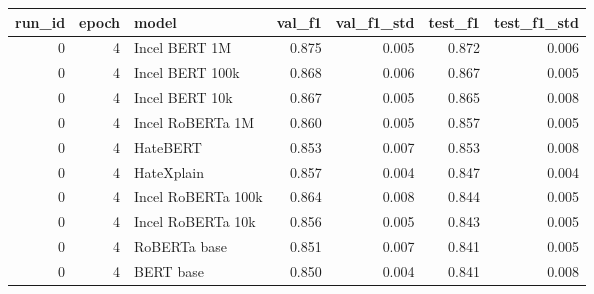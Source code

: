 \begin{tabular}{rrlrrrr}
\toprule
 run\_id &  epoch &              model &  val\_f1 &  val\_f1\_std &  test\_f1 &  test\_f1\_std \\
\midrule
      0 &      4 &      Incel BERT 1M &   0.875 &       0.005 &    0.872 &        0.006 \\
      0 &      4 &    Incel BERT 100k &   0.868 &       0.006 &    0.867 &        0.005 \\
      0 &      4 &     Incel BERT 10k &   0.867 &       0.005 &    0.865 &        0.008 \\
      0 &      4 &   Incel RoBERTa 1M &   0.860 &       0.005 &    0.857 &        0.005 \\
      0 &      4 &           HateBERT &   0.853 &       0.007 &    0.853 &        0.008 \\
      0 &      4 &         HateXplain &   0.857 &       0.004 &    0.847 &        0.004 \\
      0 &      4 & Incel RoBERTa 100k &   0.864 &       0.008 &    0.844 &        0.005 \\
      0 &      4 &  Incel RoBERTa 10k &   0.856 &       0.005 &    0.843 &        0.005 \\
      0 &      4 &       RoBERTa base &   0.851 &       0.007 &    0.841 &        0.005 \\
      0 &      4 &          BERT base &   0.850 &       0.004 &    0.841 &        0.008 \\
\bottomrule
\end{tabular}

